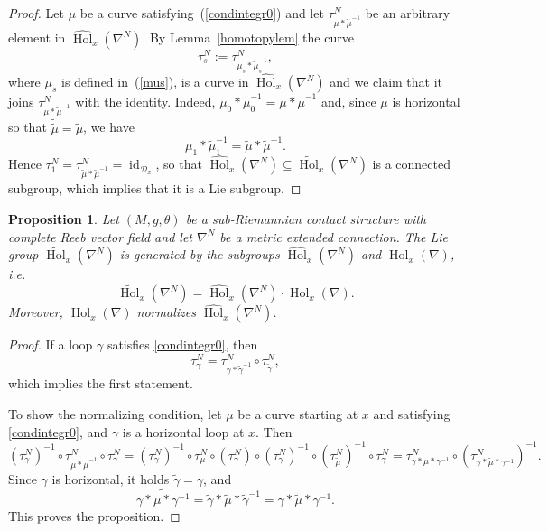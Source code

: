 \documentclass{amsart}
\theoremstyle{plain}
\newtheorem{prop}[theorem]{Proposition}
\theoremstyle{definition}
\newcommand{\Hol}{\operatorname{Hol}}
\newcommand{\id}{\operatorname{id}}
\newcommand{\1}{\mathbf{1}}
\newcommand{\D}{{\mathcal D}}
\newcommand{\+}{\oplus}
\newcommand{\tcom}[1]{
 \marginpar{{\scriptsize  T: #1 }}}
\begin{document}
\begin{proof}
Let $\mu$ be a curve satisfying~(\ref{condintegr0}) and let $\tau^N_{\mu\ast \tilde{\mu}^{-1}}$ be an arbitrary element in $\widehat{\Hol}_x(\nabla^N)$.
By Lemma~\ref{homotopylem} the curve
\[\tau_s^N:=\tau^N_{\mu_s*\tilde\mu_s^{-1}},\]
where $\mu_s$ is defined in~(\ref{mus}), is a curve in $\widehat{\Hol}_x(\nabla^N)$ and we claim that it joins 
$\tau^N_{\mu\ast \tilde{\mu}^{-1}}$ with the identity. Indeed, $\mu_0*\tilde\mu_0^{-1}= \mu*\tilde\mu^{-1}$ and, since $\tilde \mu $ is horizontal so that $\tilde{\tilde{\mu}}=\tilde\mu$, we have
\[\mu_1*\tilde\mu_1^{-1}= \tilde\mu*\tilde \mu^{-1}.\] 
Hence $\tau_1^N= \tau^N_{\tilde\mu*\tilde \mu^{-1}}=\id_{\D_x}$, so that 
$\widehat{\Hol}_x(\nabla^N)\subseteq \widetilde{\Hol}_x(\nabla^N)$ is a connected  subgroup, which implies that it is a Lie subgroup. \end{proof}
%
%
%

\begin{prop}\label{product-prop}
Let $(M,g,\theta)$ be a sub-Riemannian contact structure with complete Reeb vector field and let $\nabla^N$ be a metric extended connection.
The Lie group $\widetilde{\Hol}_x(\nabla^N)$ is generated by the subgroups $\widehat{\Hol}_x(\nabla^N)$ and $\Hol_x(\nabla)$, i.e. 
\[
\widetilde{\Hol}_x(\nabla^N)= \widehat{\Hol}_x(\nabla^N)\cdot\Hol_x(\nabla).\]
Moreover, 
 $\Hol_x(\nabla)$ normalizes  $\widehat{\Hol}_x(\nabla^N)$.
\end{prop}



\begin{proof}

If a loop $\gamma$ satisfies \eqref{condintegr0}, then
$$\tau^N_\gamma=\tau^N_{\gamma*\tilde\gamma^{-1}}\circ\tau^N_{\tilde\gamma},$$ which implies the first statement.


To show the normalizing condition, let $\mu$ be a curve starting at $x$ and satisfying \eqref{condintegr0}, and $\gamma$ is a horizontal loop at $x$. Then 
$$(\tau^N_\gamma)^{-1}\circ\tau^N_{\mu*\tilde\mu^{-1}}\circ\tau^N_\gamma=(\tau^N_\gamma)^{-1}\circ\tau^N_\mu\circ(\tau^N_\gamma)\circ(\tau^N_\gamma)^{-1}\circ(\tau^N_{\tilde\mu})^{-1}\circ\tau^N_\gamma=\tau^N_{\gamma*\mu*\gamma^{-1}}\circ
(\tau^N_{\gamma*\tilde\mu*\gamma^{-1}})^{-1}.$$  Since $\gamma$ is horizontal, it holds $\tilde\gamma=\gamma$, and
$$\widetilde{\gamma*\mu*\gamma^{-1}}=\tilde\gamma*\tilde\mu*\tilde\gamma^{-1}=
\gamma*\tilde\mu*\gamma^{-1}.$$
This proves the proposition. \end{proof}
\end{document}
